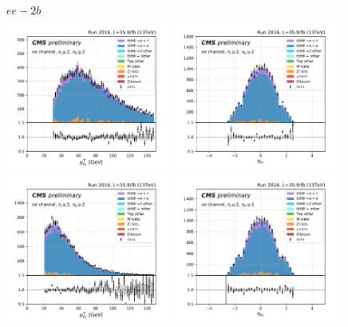 \begin{figure}[ht]
    \centering
    $ee - 2b$ \\
    \includegraphics[width=0.49\textwidth]{chapters/Analysis/sectionPlots/figures/kinematics_pickles/ee/2b/ee_2b_lepton1_pt.pdf}
    \includegraphics[width=0.49\textwidth]{chapters/Analysis/sectionPlots/figures/kinematics_pickles/ee/2b/ee_2b_lepton1_eta.pdf}
    \includegraphics[width=0.49\textwidth]{chapters/Analysis/sectionPlots/figures/kinematics_pickles/ee/2b/ee_2b_lepton2_pt.pdf}
    \includegraphics[width=0.49\textwidth]{chapters/Analysis/sectionPlots/figures/kinematics_pickles/ee/2b/ee_2b_lepton2_eta.pdf}

\end{figure}
